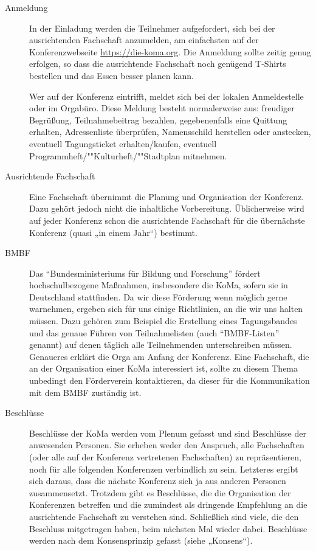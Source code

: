 \begin{description}
\item[Anmeldung]
    In der Einladung werden die Teilnehmer aufgefordert, sich bei der ausrichtenden Fachschaft anzumelden, am einfachsten auf der Konferenzwebseite \url{https://die-koma.org}. Die Anmeldung sollte zeitig genug erfolgen, so dass die ausrichtende Fachschaft noch genügend T-Shirts bestellen und das Essen besser planen kann.

	Wer auf der Konferenz eintrifft, meldet sich bei der lokalen Anmeldestelle oder im Orgabüro. Diese Meldung besteht normalerweise aus: freudiger Begrüßung, Teilnahmebeitrag bezahlen, gegebenenfalls eine Quittung erhalten, Adressenliste überprüfen, Namensschild herstellen oder anstecken, eventuell Tagungsticket erhalten/kaufen, eventuell Programmheft/""Kulturheft/""Stadtplan mitnehmen.

\item[Ausrichtende Fachschaft]
    Eine Fachschaft übernimmt die Planung und Organisation der Konferenz. Dazu gehört jedoch nicht die inhaltliche Vorbereitung. Üblicherweise wird auf jeder Konferenz schon die ausrichtende Fachschaft für die übernächste Konferenz (quasi „in einem Jahr“) bestimmt.

\item[BMBF]
    Das \enquote{Bundesministeriums für Bildung und Forschung} fördert hochschulbezogene Maßnahmen, insbesondere die KoMa, sofern sie in Deutschland stattfinden. Da wir diese Förderung wenn möglich gerne warnehmen, ergeben sich für uns einige Richtlinien, an die wir uns halten müssen. Dazu gehören zum Beispiel die Erstellung eines Tagungsbandes und das genaue Führen von Teilnahmelisten (auch \enquote{BMBF-Listen} genannt) auf denen täglich alle Teilnehmenden unterschreiben müssen. Genaueres erklärt die Orga am Anfang der Konferenz. Eine Fachschaft, die an der Organisation einer KoMa interessiert ist, sollte zu diesem Thema unbedingt den Förderverein kontaktieren, da dieser für die Kommunikation mit dem BMBF zuständig ist.

\item[Beschlüsse]
    Beschlüsse der KoMa werden vom Plenum gefasst und sind Beschlüsse der anwesenden Personen. Sie erheben weder den Anspruch, alle Fachschaften (oder alle auf der Konferenz vertretenen Fachschaften) zu 	repräsentieren, noch für alle folgenden Konferenzen verbindlich zu sein. Letzteres ergibt sich daraus, dass die nächste Konferenz sich ja aus anderen Personen zusammensetzt. Trotzdem gibt es Beschlüsse, die die Organisation der Konferenzen betreffen und die zumindest als dringende Empfehlung an die ausrichtende Fachschaft zu verstehen sind. Schließlich sind viele, die den Beschluss mitgetragen haben, beim nächsten Mal wieder dabei. Beschlüsse werden nach dem Konsensprinzip gefasst (siehe „Konsens“).


\end{description}
